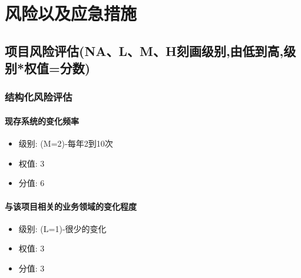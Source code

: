\documentclass[hyperref, a4paper]{ctexart}
\providecommand{\tightlist}{%
  \setlength{\itemsep}{0pt}\setlength{\parskip}{0pt}}
\let\oldparagraph\paragraph
\renewcommand{\paragraph}[1]{\oldparagraph{#1}\mbox{}}
\begin{document}
\hypertarget{ux98ceux9669ux4ee5ux53caux5e94ux6025ux63aaux65bd}{%
\section{风险以及应急措施}\label{ux98ceux9669ux4ee5ux53caux5e94ux6025ux63aaux65bd}}

\hypertarget{ux9879ux76eeux98ceux9669ux8bc4ux4f30nalmhux523bux753bux7ea7ux522bux7531ux4f4eux5230ux9ad8ux7ea7ux522bux6743ux503cux5206ux6570}{%
\subsection{项目风险评估(NA、L、M、H刻画级别,由低到高,级别*权值=分数)}\label{ux9879ux76eeux98ceux9669ux8bc4ux4f30nalmhux523bux753bux7ea7ux522bux7531ux4f4eux5230ux9ad8ux7ea7ux522bux6743ux503cux5206ux6570}}

\hypertarget{ux7ed3ux6784ux5316ux98ceux9669ux8bc4ux4f30}{%
\subsubsection{结构化风险评估}\label{ux7ed3ux6784ux5316ux98ceux9669ux8bc4ux4f30}}

\hypertarget{ux73b0ux5b58ux7cfbux7edfux7684ux53d8ux5316ux9891ux7387}{%
\paragraph{现存系统的变化频率}\label{ux73b0ux5b58ux7cfbux7edfux7684ux53d8ux5316ux9891ux7387}}

\begin{itemize}
\tightlist
\item
  级别: (M=2)-每年2到10次
\item
  权值: 3
\item
  分值: 6
\end{itemize}

\hypertarget{ux4e0eux8be5ux9879ux76eeux76f8ux5173ux7684ux4e1aux52a1ux9886ux57dfux7684ux53d8ux5316ux7a0bux5ea6}{%
\paragraph{与该项目相关的业务领域的变化程度}\label{ux4e0eux8be5ux9879ux76eeux76f8ux5173ux7684ux4e1aux52a1ux9886ux57dfux7684ux53d8ux5316ux7a0bux5ea6}}

\begin{itemize}
\tightlist
\item
  级别: (L=1)-很少的变化
\item
  权值: 3
\item
  分值: 3
\end{itemize}
\end{document}
